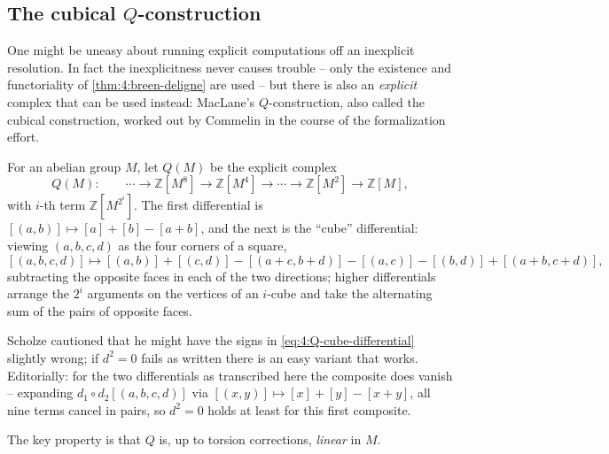 \subsection{The cubical \texorpdfstring{$Q$}{Q}-construction}

One might be uneasy about running explicit computations off an inexplicit
resolution. In fact the inexplicitness never causes trouble -- only the
existence and functoriality of \cref{thm:4:breen-deligne} are used -- but there
is also an \emph{explicit} complex that can be used instead: MacLane's
$Q$-construction, also called the cubical construction, worked out by Commelin in
the course of the formalization effort.

\begin{definition}
\label{def:4:cubical}
For an abelian group $M$, let $Q(M)$ be the explicit complex
\begin{equation*}
Q(M):\qquad
\cdots\to\mathbb{Z}[M^{8}]\to\mathbb{Z}[M^{4}]\to\cdots\to
\mathbb{Z}[M^{2}]\to\mathbb{Z}[M],
\end{equation*}
with $i$-th term $\mathbb{Z}[M^{2^{i}}]$. The first differential is
$[(a,b)]\mapsto[a]+[b]-[a+b]$, and the next is the ``cube'' differential: viewing
$(a,b,c,d)$ as the four corners of a square,
\begin{equation}
\label{eq:4:Q-cube-differential}
[(a,b,c,d)]\longmapsto
[(a,b)]+[(c,d)]-[(a+c,b+d)]-[(a,c)]-[(b,d)]+[(a+b,c+d)],
\end{equation}
subtracting the opposite faces in each of the two directions; higher differentials
arrange the $2^{i}$ arguments on the vertices of an $i$-cube and take the
alternating sum of the pairs of opposite faces.
\end{definition}

\begin{remark}
\label{rmk:4:cube-signs}
Scholze cautioned that he might have the signs in
\eqref{eq:4:Q-cube-differential} slightly wrong; if $d^{2}=0$ fails as written
there is an easy variant that works. Editorially: for the two differentials as
transcribed here the composite does vanish -- expanding
$d_1\circ d_2[(a,b,c,d)]$ via $[(x,y)]\mapsto[x]+[y]-[x+y]$, all nine terms
cancel in pairs, so $d^2=0$ holds at least for this first composite.
\end{remark}

The key property is that $Q$ is, up to torsion corrections, \emph{linear} in
$M$.

